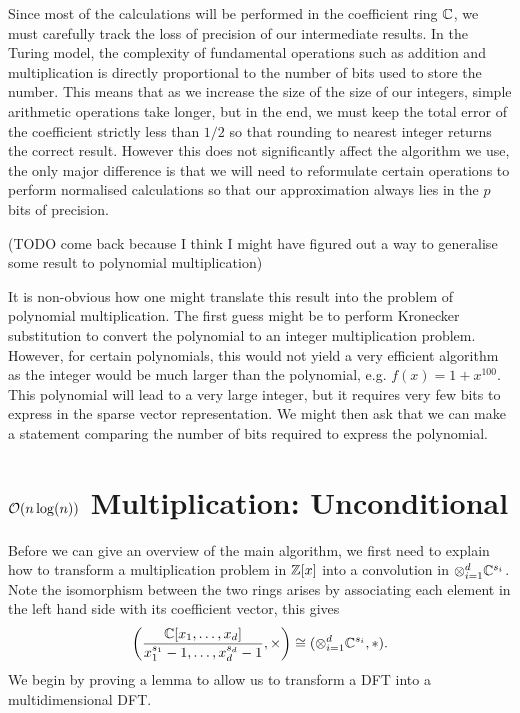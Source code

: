 Since most of the calculations will be performed in the coefficient ring ${\mathbb C}$, we must carefully track the loss of precision of our intermediate results. In the Turing model, the complexity of fundamental operations such as addition and multiplication is directly proportional to the number of bits used to store the number. This means that as we increase the size of the size of our integers, simple arithmetic operations take longer, but in the end, we must keep the total error of the coefficient strictly less than $1/2$ so that rounding to nearest integer returns the correct result. However this does not significantly affect the algorithm we use, the only major difference is that we will need to reformulate certain operations to perform normalised calculations so that our approximation always lies in the $p$ bits of precision.

\medskip

(TODO come back because I think I might have figured out a way to generalise some result to polynomial multiplication)

\medskip

It is non-obvious how one might translate this result into the problem of polynomial multiplication. The first guess might be to perform Kronecker substitution to convert the polynomial to an integer multiplication problem. However, for certain polynomials, this would not yield a very efficient algorithm as the integer would be much larger than the polynomial, e.g. $f(x) = 1 + x^{100}$.\\
This polynomial will lead to a very large integer, but it requires very few bits to express in the sparse vector representation. We might then ask that we can make a statement comparing the number of bits required to express the polynomial.

\section{$\mathcal O(n\log(n))$ Multiplication: Unconditional}
\label{subsec:nlogn}

Before we can give an overview of the main algorithm, we first need to explain how to transform a multiplication problem in ${\mathbb Z}[x]$ into a convolution in $\otimes_{i=1}^{d} {\mathbb C}^{s_i}$.\\
Note the isomorphism between the two rings arises by associating each element in the left hand side with its coefficient vector, this gives
\begin{equation}\label{eq:mult-to-convolution}
    \left(\frac{{\mathbb C}[x_1, \ldots, x_d]}{x_1^{s_1} - 1, \ldots, x_d^{s_d} - 1}, \times\right) \cong (\otimes_{i=1}^d {\mathbb C}^{s_i}, \ast).
\end{equation}
We begin by proving a lemma to allow us to transform a DFT into a multidimensional DFT.

